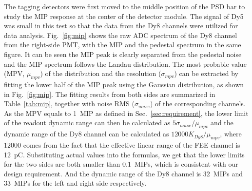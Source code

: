 \documentclass[preprint, times]{elsarticle}
\begin{document}
The tagging detectors were first moved to the middle position of the PSD bar to study the MIP response at the center of the detector module.
The signal of Dy5 was small in this test so that the data from the Dy8 channels were utilized for data analysis.
Fig.~\ref{fig:mip} shows the raw ADC spectrum of the Dy8 channel from the right-side PMT, with the MIP and the pedestal spectrum in the same figure.
It can be seen the MIP peak is clearly separated from the pedestal noise and the MIP spectrum follows the Landau distribution.
The most probable value (MPV, $\mu_{mpv}$) of the distribution and the resolution ($\sigma_{mpv}$) can be extracted by fitting the lower half of the MIP peak using the Gaussian distribution, as shown in Fig.~\ref{fig:mip}.
The fitting results from both sides are summarized in Table~\ref{tab:mip}, together with noise RMS ($\sigma_{noise}$) of the corresponding channels.
As the MPV equals to \SI{1}{MIP} as defined in Sec.~\ref{sec:requirement}, the lower limit of the readout dynamic range can then be calculated as $5\sigma_{noise}/\mu_{mpv}$ and the dynamic range of the Dy8 channel can be calculated as $12000K_{Dy8}/\mu_{mpv}$, where $12000$ comes from the fact that the effective linear range of the FEE channel is \SI{12}{\pico\coulomb}.
Substituting actual values into the formulas, we get that the lower limits for the two sides are both smaller than \SI{0.1}{MIPs}, which is consistent with our design requirement. 
And the dynamic range of the Dy8 channel is \SI{32}{MIPs} and \SI{33}{MIPs} for the left and right side respectively.

\end{document}

